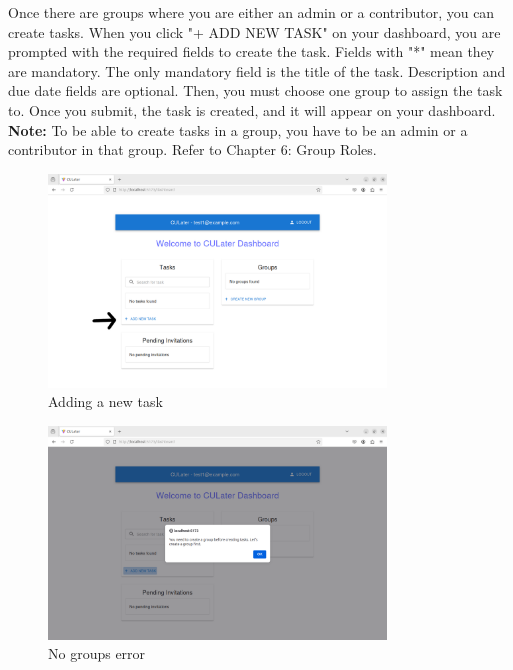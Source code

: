\documentclass{scrreprt}
\begin{document}
Once there are groups where you are either an admin or a contributor, you can create tasks. When you click "+ ADD NEW TASK" on your dashboard, you are prompted with the required fields to create the task. Fields with "*" mean they are mandatory. The only mandatory field is the title of the task. Description and due date fields are optional. Then, you must choose one group to assign the task to. Once you submit, the task is created, and it will appear on your dashboard.\\

\textbf{Note:} To be able to create tasks in a group, you have to be an admin or a contributor in that group. Refer to Chapter 6: Group Roles.\\
\begin{figure}[htbp]
        \centering
        \includegraphics[width=0.8\textwidth]{dashboard_add_task.png}
	\caption{Adding a new task}
	\label{fig:my_label}
\end{figure}
\begin{figure}[htbp]
        \centering
        \includegraphics[width=0.8\textwidth]{create_task_no_group.png}
	\caption{No groups error}
	\label{fig:my_label}
\end{figure}
\end{document}
